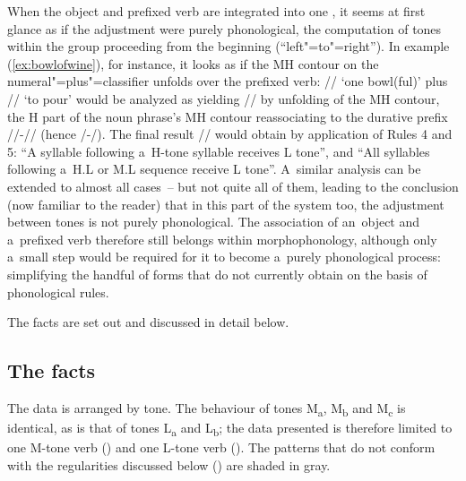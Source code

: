 When the object and prefixed verb are integrated into one , it seems at first glance
as if the adjustment were purely phonological, the computation of tones within the group proceeding
from the beginning (“left"=to"=right”). In example (\ref{ex:bowlofwine}), for instance, it looks as if
the MH contour on the numeral"=plus"=classifier unfolds over the prefixed verb: //
‘one bowl(ful)’ plus // ‘to pour’ would be analyzed as yielding // by unfolding of the MH contour, the H part of the noun phrase’s MH contour
reassociating to the {durative} prefix //-// (hence /-/). The final result // would
obtain by application of Rules 4 and 5: “A syllable following a~H-tone syllable receives L tone”,
and “All syllables following a~H.L or M.L sequence receive L tone”. A~similar analysis can be
extended to almost all cases~-- but not quite all of them, leading to the conclusion (now familiar to the reader) that in this part of the system too, the adjustment between tones is not purely phonological. The association of an~object and a~prefixed verb therefore
still belongs within morphophonology, although only a~small step would be required for
it to become a~purely phonological process: simplifying the handful of forms that do not currently
obtain on the basis of phonological rules. 

The facts are set out and discussed in detail below.


\subsection{The facts}
\label{sec:thefactsobjectandprefixedverb}

The data is arranged by tone. The behaviour of tones M\textsubscript{a}, M\textsubscript{b} and M\textsubscript{c} is identical, as is that
of tones L\textsubscript{a} and L\textsubscript{b}; the data presented is therefore limited to one M-tone verb ()
and one L-tone verb
(). The patterns that do not conform with the regularities
discussed below () are shaded in gray.

